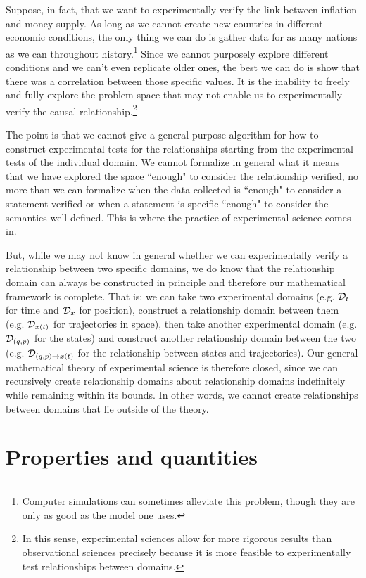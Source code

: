 \documentclass[11pt,letterpaper,fleqn]{memoir} %
\begin{document}
Suppose, in fact, that we want to experimentally verify the link between inflation and money supply. As long as we cannot create new countries in different economic conditions, the only thing we can do is gather data for as many nations as we can throughout history.\footnote{Computer simulations can sometimes alleviate this problem, though they are only as good as the model one uses.} Since we cannot purposely explore different conditions and we can't even replicate older ones, the best we can do is show that there was a correlation between those specific values. It is the inability to freely and fully explore the problem space that may not enable us to experimentally verify the causal relationship.\footnote{In this sense, experimental sciences allow for more rigorous results than observational sciences precisely because it is more feasible to experimentally test relationships between domains.}

The point is that we cannot give a general purpose algorithm for how to construct experimental tests for the relationships starting from the experimental tests of the individual domain. We cannot formalize in general what it means that we have explored the space ``enough" to consider the relationship verified, no more than we can formalize when the data collected is ``enough" to consider a statement verified or when a statement is specific ``enough" to consider the semantics well defined. This is where the practice of experimental science comes in.

But, while we may not know in general whether we can experimentally verify a relationship between two specific domains, we do know that the relationship domain can always be constructed in principle and therefore our mathematical framework is complete. That is: we can take two experimental domains (e.g. $\mathcal{D}_t$ for time and $\mathcal{D}_x$ for position), construct a relationship domain between them (e.g. $\mathcal{D}_{x(t)}$ for trajectories in space), then take another experimental domain (e.g. $\mathcal{D}_{(q,p)}$ for the states) and construct another relationship domain between the two (e.g. $\mathcal{D}_{(q,p)\to x(t)}$ for the relationship between states and trajectories). Our general mathematical theory of experimental science is therefore closed, since we can recursively create relationship domains about relationship domains indefinitely while remaining within its bounds. In other words, we cannot create relationships between domains that lie outside of the theory.

\section{Properties and quantities}
\end{document}
